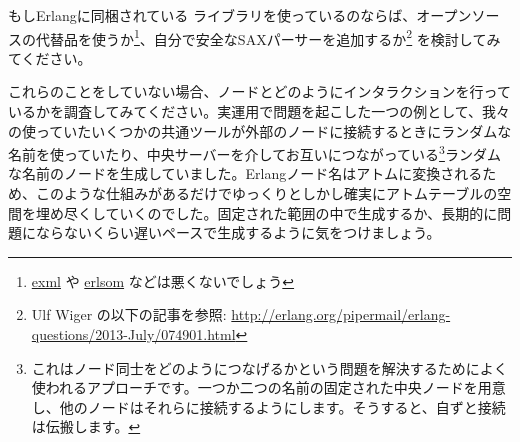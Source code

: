 もしErlangに同梱されている  ライブラリを使っているのならば、オープンソースの代替品を使うか\footnote{\href{https://github.com/paulgray/exml}{exml} や \href{https://github.com/willemdj/erlsom}{erlsom} などは悪くないでしょう}、自分で安全なSAXパーサーを追加するか\footnote{Ulf Wiger の以下の記事を参照:  \href{http://erlang.org/pipermail/erlang-questions/2013-July/074901.html}{http://erlang.org/pipermail/erlang-questions/2013-July/074901.html}} を検討してみてください。

これらのことをしていない場合、ノードとどのようにインタラクションを行っているかを調査してみてください。実運用で問題を起こした一つの例として、我々の使っていたいくつかの共通ツールが外部のノードに接続するときにランダムな名前を使っていたり、中央サーバーを介してお互いにつながっている\footnote{これはノード同士をどのようにつなげるかという問題を解決するためによく使われるアプローチです。一つか二つの名前の固定された中央ノードを用意し、他のノードはそれらに接続するようにします。そうすると、自ずと接続は伝搬します。}ランダムな名前のノードを生成していました。Erlangノード名はアトムに変換されるため、このような仕組みがあるだけでゆっくりとしかし確実にアトムテーブルの空間を埋め尽くしていくのでした。固定された範囲の中で生成するか、長期的に問題にならないくらい遅いペースで生成するように気をつけましょう。

